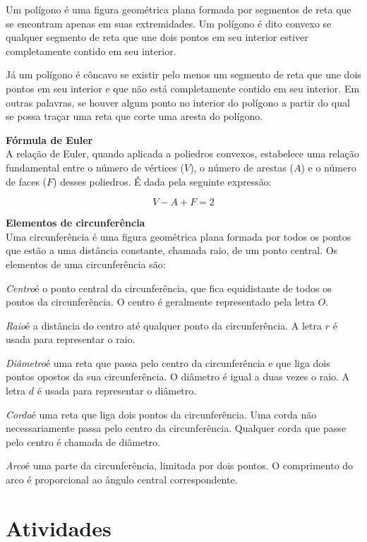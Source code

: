 {{{{{Um polígono é uma figura geométrica plana formada por segmentos de reta
que se encontram apenas em suas extremidades. Um polígono é dito convexo
se qualquer segmento de reta que une dois pontos em seu interior estiver
completamente contido em seu interior.

Já um polígono é côncavo se existir pelo menos um segmento de reta que
une dois pontos em seu interior e que não está completamente contido em
seu interior. Em outras palavras, se houver algum ponto no interior do
polígono a partir do qual se possa traçar uma reta que corte uma aresta
do polígono.

\textbf{Fórmula de Euler}\\

\noindent A relação de Euler, quando aplicada a poliedros convexos, estabelece uma
relação fundamental entre o número de vértices ($V$), o número de arestas ($A$) e o
número de faces ($F$) desses poliedros. É dada pela seguinte expressão:

$$V - A + F = 2$$

\textbf{Elementos de circunferência}\\

\noindent Uma circunferência é uma figura geométrica plana formada por todos os
pontos que estão a uma distância constante, chamada raio, de um ponto
central. Os elementos de uma circunferência são:

\noindent\textit{Centro}\quad é o ponto central da circunferência, que fica equidistante de
todos os pontos da circunferência. O centro é geralmente representado
pela letra $O$.

\noindent\textit{Raio}\quad é a distância do centro até qualquer ponto da
circunferência. A letra $r$ é usada para representar o raio.

\noindent\textit{Diâmetro}\quad é uma reta que passa pelo centro da circunferência e que liga
dois pontos opostos da sua circunferência. O diâmetro é igual a duas
vezes o raio. A letra $d$ é usada para representar o diâmetro.

\noindent\textit{Corda}\quad é uma reta que liga dois pontos da circunferência. Uma corda não
necessariamente passa pelo centro da circunferência. Qualquer corda que
passe pelo centro é chamada de diâmetro.

\noindent\textit{Arco}\quad é uma parte da circunferência, limitada por dois pontos. O
comprimento do arco é proporcional ao ângulo central correspondente.}

\section*{Atividades}

}}}}
